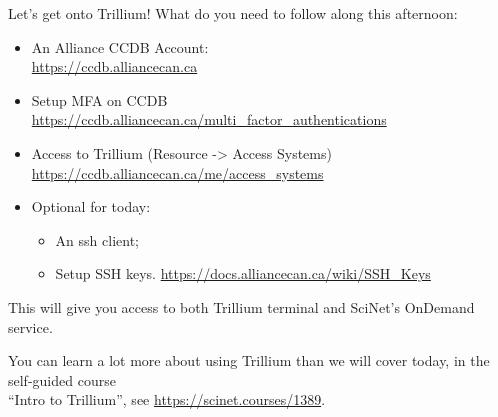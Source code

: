 \documentclass[
  10pt,
  ignorenonframetext,
  aspectratio=169,handout]{beamer}
\providecommand{\tightlist}{%
  \setlength{\itemsep}{0pt}\setlength{\parskip}{0pt}}
\begin{document}
\begin{frame}{Let's get onto Trillium!}
\label{lets-get-onto-trillium}
What do you need to follow along this afternoon:

\begin{itemize}
\item
  An Alliance CCDB Account:\\
  \alert{\url{https://ccdb.alliancecan.ca}}

  \pause
\item
  Setup MFA on CCDB\\
  \alert{\url{https://ccdb.alliancecan.ca/multi_factor_authentications}}

  \pause
\item
  Access to Trillium (Resource -\textgreater{} Access Systems)\\
  \alert{\url{https://ccdb.alliancecan.ca/me/access_systems}}

  \pause
\item
  Optional for today:

  \begin{itemize}
  \tightlist
  \item
    An ssh client;
  \item
    Setup SSH keys. \alert{\url{https://docs.alliancecan.ca/wiki/SSH_Keys}}
  \end{itemize}
\end{itemize}

\pause

This will give you access to both Trillium terminal and SciNet's OnDemand service.

\pause

You can learn a lot more about using Trillium than we will cover today, in the self-guided course\\
``Intro to Trillium'', see \alert{\url{https://scinet.courses/1389}}.
\end{frame}
\end{document}
